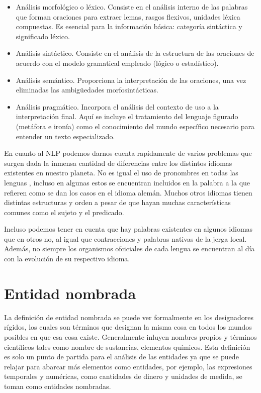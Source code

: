 \documentclass[runningheads]{llncs}
\begin{document}
\begin{itemize}
    \item Análisis morfológico o léxico. Consiste en el análisis interno de las palabras que forman oraciones para extraer lemas, rasgos flexivos, unidades léxica compuestas. Es esencial para la información básica: categoría sintáctica y significado léxico.
    \item Análisis sintáctico. Consiste en el análisis de la estructura de las oraciones de acuerdo con el modelo gramatical empleado (lógico o estadístico).
    \item Análisis semántico. Proporciona la interpretación de las oraciones, una vez eliminadas las ambigüedades morfosintácticas.
    \item Análisis pragmático. Incorpora el análisis del contexto de uso a la interpretación final. Aquí se incluye el tratamiento del lenguaje figurado (metáfora e ironía) como el conocimiento del mundo específico necesario para entender un texto especializado.
\end{itemize}


 
En cuanto al NLP podemos darnos cuenta rapidamente de varios problemas que surgen dada la inmensa cantidad de diferencias entre los distintos idiomas existentes en nuestro planeta. No es igual el uso de pronombres en todas las lenguas , incluso en algunas estos se encuentran incluidos en la palabra a la que refieren como se dan los casos en el idioma alemán. Muchos otros idiomas tienen distintas estructuras y orden a pesar de que hayan muchas características comunes como el sujeto y el predicado.

Incluso podemos tener en cuenta que hay palabras existentes en algunos idiomas que en otros no, al igual que contracciones y palabras nativas de la jerga local. Además, no siempre los organismos ofciciales de cada lengua se encuentran al día con la evolución de su respectivo idioma.


\section{Entidad nombrada}

La definición de entidad nombrada se puede ver formalmente en los designadores rígidos\cite{rigid_designator}, los cuales son términos que designan la misma cosa en todos los mundos posibles en que esa cosa existe. Generalmente inluyen nombres propios y términos científicos tales como nombre de sustancias, elementos químicos. Esta definición es solo un punto de partida para el análisis de las entidades ya que se puede relajar  para abarcar más elementos como entidades, por ejemplo, las expresiones temporales y numéricas, como cantidades de dinero y unidades de medida, se toman como entidades nombradas. 
\end{document}
